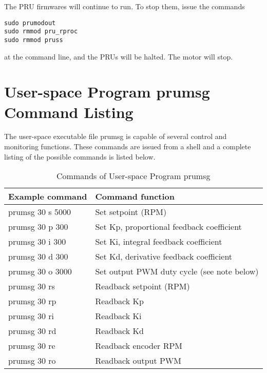 The PRU firmwares will continue to run.  To stop them, issue the commands

\begin{verbatim}
sudo prumodout
sudo rmmod pru_rproc
sudo rmmod pruss
\end{verbatim}

at the command line, and the PRUs will be halted.  The motor will stop.

\section{User-space Program prumsg Command Listing}

The user-space executable file prumsg is capable of several control and monitoring functions.  These commands are issued from a shell and a complete listing of the possible commands is listed below.

\begin{longtable}{ll}
\caption{Commands of User-space Program prumsg}\\
\toprule
Example command & Command function \\\midrule
prumsg 30 s 5000 & Set setpoint (RPM) \\ 
prumsg 30 p 300 & Set Kp, proportional feedback coefficient \\ 
prumsg 30 i 300 & Set Ki, integral feedback coefficient \\ 
prumsg 30 d 300 & Set Kd, derivative feedback coefficient \\ 
prumsg 30 o 3000 & Set output PWM duty cycle (see note below) \\ 
prumsg 30 rs & Readback setpoint (RPM) \\ 
prumsg 30 rp & Readback Kp \\ 
prumsg 30 ri & Readback Ki \\ 
prumsg 30 rd & Readback Kd \\ 
prumsg 30 re & Readback encoder RPM \\
prumsg 30 ro & Readback output PWM
\end{longtable}

